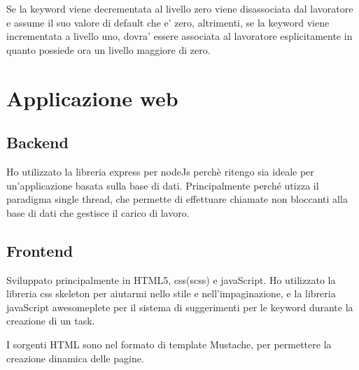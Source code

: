 \documentclass[a4paper]{article}
\begin{document}
Se la keyword viene decrementata al livello zero viene disassociata dal lavoratore e assume il suo valore di default che e' zero, altrimenti, se la keyword viene incrementata a livello uno, dovra' essere associata al lavoratore esplicitamente in quanto possiede ora un livello maggiore di zero.

\section{Applicazione web}
\subsection{Backend}
Ho utilizzato la libreria express per nodeJs perch\`e ritengo sia ideale per un'applicazione basata sulla base di dati. Principalmente perch\'e utizza il paradigma single thread, che permette di effettuare chiamate non bloccanti alla base di dati che gestisce il carico di lavoro.

\subsection{Frontend}
Sviluppato principalmente in HTML5, css(scss) e javaScript.
Ho utilizzato la libreria css skeleton per aiutarmi nello stile e nell'impaginazione, e la libreria javaScript awesomeplete per il sistema di suggerimenti per le keyword durante la creazione di un task.

I sorgenti HTML sono nel formato di template Mustache,
per permettere la creazione dinamica delle pagine.
\end{document}
